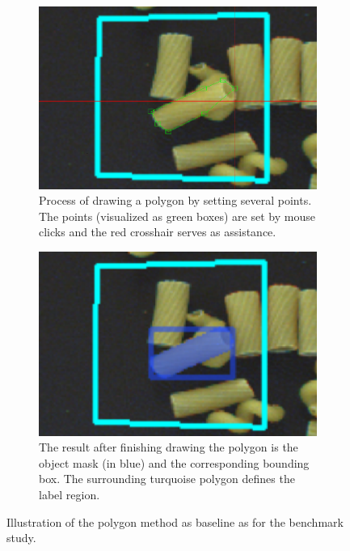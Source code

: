 \begin{figure} [h]
	\centering
	\begin{subfigure}[t]{0.45\textwidth}
		\centering
		\includegraphics[width=\textwidth]{figures/chap31_polygon_drawing.png}
		\caption{
			Process of drawing a polygon by setting several points.
			The points (visualized as green boxes) are set by mouse clicks and the red crosshair serves as assistance.
		}\label{fig:ch3:sec1:polygon_drawing}
	\end{subfigure}
	\hfill
	\begin{subfigure}[t]{0.45\textwidth}
		\centering
		\includegraphics[width=\textwidth]{figures/chap31_polygon_result.png}
		\caption{
			The result after finishing drawing the polygon is the object mask (in blue) and the corresponding bounding box.
			The surrounding turquoise polygon defines the label region.
		}\label{fig:ch3:sec1:polygon_result}
	\end{subfigure}
	\caption[Illustration of the polygon method]{
		Illustration of the polygon method as baseline as for the benchmark study.
	}\label{fig:ch3:sec1:polygon_method}
\end{figure}
